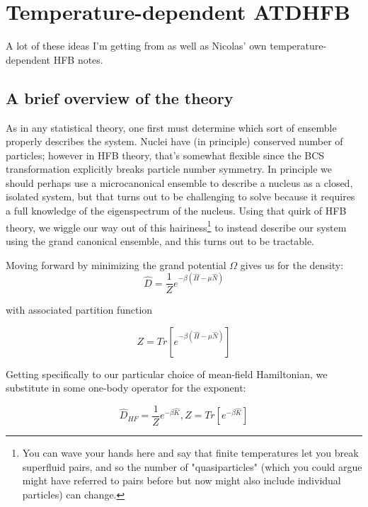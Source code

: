 \chapter{Temperature-dependent ATDHFB}

A lot of these ideas I'm getting from \cite{Schunck2015} as well as Nicolas' own temperature-dependent HFB notes.

\section{A brief overview of the theory}

As in any statistical theory, one first must determine which sort of ensemble properly describes the system. Nuclei have (in principle) conserved number of particles; however in HFB theory, that's somewhat flexible since the BCS transformation explicitly breaks particle number symmetry. In principle we should perhaps use a microcanonical ensemble to describe a nucleus as a closed, isolated system, but that turns out to be challenging to solve because it requires a full knowledge of the eigenspectrum of the nucleus. Using that quirk of HFB theory, we wiggle our way out of this hairiness\footnote{You can wave your hands here and say that finite temperatures let you break superfluid pairs, and so the number of "quasiparticles" (which you could argue might have referred to pairs before but now might also include individual particles) can change.} to instead describe our system using the grand canonical ensemble, and this turns out to be tractable.

Moving forward by minimizing the grand potential $\Omega$ gives us for the density:
\begin{equation*}
\hat{D} = \frac{1}{Z}e^{-\beta\left(\hat{H}-\mu\hat{N}\right)}
\end{equation*}

\noindent with associated partition function

\begin{equation*}
Z = Tr\left[e^{-\beta\left(\hat{H}-\mu\hat{N}\right)}\right]
\end{equation*}

Getting specifically to our particular choice of mean-field Hamiltonian, we substitute in some one-body operator for the exponent:

\begin{equation*}
\hat{D}_{HF} = \frac{1}{Z}e^{-\beta\hat{K}}, Z = Tr\left[e^{-\beta\hat{K}}\right]
\end{equation*}

